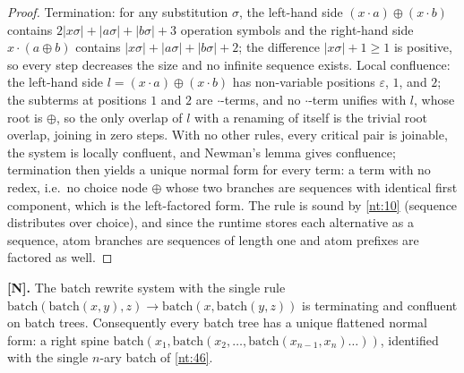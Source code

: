 \begin{proof}
Termination: for any substitution $\sigma$, the left-hand side
$(x \cdot a) \oplus (x \cdot b)$ contains $2|x\sigma| + |a\sigma| +
|b\sigma| + 3$ operation symbols and the right-hand side
$x \cdot (a \oplus b)$ contains $|x\sigma| + |a\sigma| + |b\sigma| + 2$;
the difference $|x\sigma| + 1 \geq 1$ is positive, so every step decreases
the size and no infinite sequence exists. Local confluence: the left-hand
side $l = (x \cdot a) \oplus (x \cdot b)$ has non-variable positions
$\varepsilon$, $1$, and $2$; the subterms at positions $1$ and $2$ are
$\cdot$-terms, and no $\cdot$-term unifies with $l$, whose root is $\oplus$,
so the only overlap of $l$ with a renaming of itself is the trivial root
overlap, joining in zero steps. With no other rules, every critical pair is
joinable, the system is locally confluent, and Newman's lemma gives
confluence; termination then yields a unique normal form for every term: a
term with no redex, i.e.\ no choice node $\oplus$ whose two branches are
sequences with identical first component, which is the left-factored form.
The rule is sound by \autoref{nt:10} (sequence distributes over choice),
and since the runtime stores each alternative as a sequence, atom branches
are sequences of length one and atom prefixes are factored as well.
\end{proof}

\begin{theorem}\label{nt:17}
\textbf{[N].} The batch rewrite system with the single rule
$\mathrm{batch}(\mathrm{batch}(x,y), z) \to
\mathrm{batch}(x, \mathrm{batch}(y,z))$ is terminating and confluent on
batch trees. Consequently every batch tree has a unique flattened normal
form: a right spine $\mathrm{batch}(x_1, \mathrm{batch}(x_2, \ldots,
\mathrm{batch}(x_{n-1}, x_n) \ldots))$, identified with the single $n$-ary
batch of \autoref{nt:46}.
\end{theorem}

